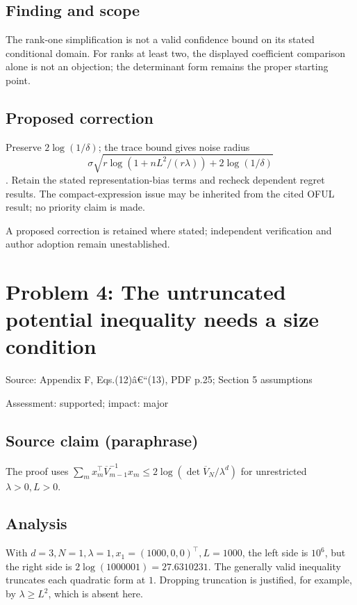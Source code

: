 \documentclass[11pt]{article}
\begin{document}
\subsection*{Finding and scope}

The rank-one simplification is not a valid confidence bound on its stated conditional domain. For ranks at least two, the displayed coefficient comparison alone is not an objection; the determinant form remains the proper starting point.

\subsection*{Proposed correction}

Preserve \(2\log(1/\delta)\); the trace bound gives noise radius \[\sigma\sqrt{r\log(1+nL^2/(r\lambda))+2\log(1/\delta)}\]. Retain the stated representation-bias terms and recheck dependent regret results. The compact-expression issue may be inherited from the cited OFUL result; no priority claim is made.

A proposed correction is retained where stated; independent verification and author adoption remain unestablished.

\section*{Problem 4: The untruncated potential inequality needs a size condition}

Source: Appendix F, Eqs.(12)â€“(13), PDF p.25; Section 5 assumptions

Assessment: supported; impact: major

\subsection*{Source claim (paraphrase)}

The proof uses \(\sum_m x_m^\top\overline V_{m-1}^{-1}x_m\le2\log(\det\overline V_N/\lambda^d)\) for unrestricted \(\lambda>0,L>0\).

\subsection*{Analysis}

With \(d=3,N=1,\lambda=1,x_1=(1000,0,0)^\top,L=1000\), the left side is \(10^6\), but the right side is \(2\log(1000001)=27.6310231\). The generally valid inequality truncates each quadratic form at \(1\). Dropping truncation is justified, for example, by \(\lambda\ge L^2\), which is absent here.
\end{document}
